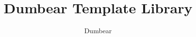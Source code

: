 \documentclass[a4paper,twocolumn]{article}
\title{Dumbear Template Library}
\author{Dumbear}
\begin{document}
\begin{titlepage}

\maketitle

\end{titlepage}

\tableofcontents

\clearpage


\end{document}
